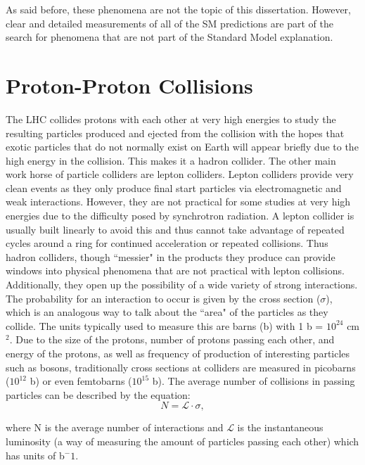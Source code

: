 As said before, these phenomena are not the topic of this dissertation. However, clear and detailed measurements of all of the SM predictions are part of the search for phenomena that are not part of the Standard Model explanation.

	\section{Proton-Proton Collisions} 
	\label{sec:pp_collisions}         
The LHC collides protons with each other at very high energies to study the resulting particles produced and ejected from the collision with the hopes that exotic particles that do not normally exist on Earth will appear briefly due to the high energy in the collision. This makes it a hadron collider. The other main work horse of particle colliders are lepton colliders. Lepton colliders provide very clean events as they only produce final start particles via electromagnetic and weak interactions. However, they are not practical for some studies at very high energies due to the difficulty posed by synchrotron radiation. A lepton collider is usually built linearly to avoid this and thus cannot take advantage of repeated cycles around a ring for continued acceleration or repeated collisions. Thus hadron colliders, though ``messier" in the products they produce can provide windows into physical phenomena that are not practical with lepton collisions. Additionally, they open up the possibility of a wide variety of strong interactions.\\

The probability for an interaction to occur is given by the cross section ($\sigma$), which is an analogous way to talk about the ``area" of the particles as they collide. The units typically used to measure this are barns (b) with 1 b = $10^{24}$ cm$^2$.  Due to the size of the protons, number of protons passing each other, and energy of the protons, as well as frequency of production of interesting particles such as bosons, traditionally cross sections at colliders are measured in picobarns ($10^{12}$ b) or even femtobarns ($10^{15}$ b). The average number of collisions in passing particles can be described by the equation:
\begin{equation}
\label{eq:lumi_xsec_relationship}
N = \mathcal{L} \cdot \sigma ,
\end{equation}

where N is the average number of interactions and $\mathcal{L}$ is the instantaneous luminosity (a way of measuring the amount of particles passing each other) which has units of b$^-1$.\\

